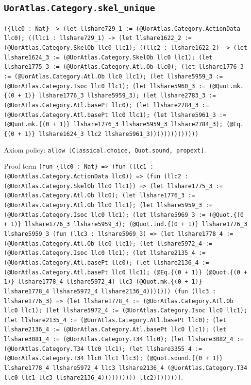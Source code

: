 \documentclass[11pt]{article}
\begin{document}
\subsection*{\texttt{UorAtlas.Category.skel\_unique}}
\noindent\texttt{(\{llc0 : Nat\} -> (let llshare729\_1 := (@UorAtlas.Category.ActionData llc0); ((llc1 : llshare729\_1) -> (let llshare1622\_2 := (@UorAtlas.Category.SkelOb llc0 llc1); ((llc2 : llshare1622\_2) -> (let llshare1624\_3 := (@UorAtlas.Category.SkelOb llc0 llc1); (let llshare1775\_3 := (@UorAtlas.Category.Atl.Ob llc0); (let llshare1776\_3 := (@UorAtlas.Category.Atl.Ob llc0 llc1); (let llshare5959\_3 := (@UorAtlas.Category.Isoc llc0 llc1); (let llshare5960\_3 := (@Quot.mk.\{(0 + 1)\} llshare1776\_3 llshare5959\_3); (let llshare2783\_3 := (@UorAtlas.Category.Atl.basePt llc0); (let llshare2784\_3 := (@UorAtlas.Category.Atl.basePt llc0 llc1); (let llshare5961\_3 := (@Quot.mk.\{(0 + 1)\} llshare1776\_3 llshare5959\_3 llshare2784\_3); (@Eq.\{(0 + 1)\} llshare1624\_3 llc2 llshare5961\_3))))))))))))))}\par
\noindent Axiom policy: \texttt{allow [Classical.choice, Quot.sound, propext]}.\par
\noindent Proof term \texttt{(fun \{llc0 : Nat\} => (fun (llc1 : (@UorAtlas.Category.ActionData llc0)) => (fun (llc2 : (@UorAtlas.Category.SkelOb llc0 llc1)) => (let llshare1775\_3 := (@UorAtlas.Category.Atl.Ob llc0); (let llshare1776\_3 := (@UorAtlas.Category.Atl.Ob llc0 llc1); (let llshare5959\_3 := (@UorAtlas.Category.Isoc llc0 llc1); (let llshare5969\_3 := (@Quot.\{(0 + 1)\} llshare1776\_3 llshare5959\_3); (@Quot.ind.\{(0 + 1)\} llshare1776\_3 llshare5959\_3 (fun (llc3 : llshare5969\_3) => (let llshare1778\_4 := (@UorAtlas.Category.Atl.Ob llc0 llc1); (let llshare5972\_4 := (@UorAtlas.Category.Isoc llc0 llc1); (let llshare2135\_4 := (@UorAtlas.Category.Atl.basePt llc0); (let llshare2136\_4 := (@UorAtlas.Category.Atl.basePt llc0 llc1); (@Eq.\{(0 + 1)\} (@Quot.\{(0 + 1)\} llshare1778\_4 llshare5972\_4) llc3 (@Quot.mk.\{(0 + 1)\} llshare1778\_4 llshare5972\_4 llshare2136\_4))))))) (fun (llc3 : llshare1776\_3) => (let llshare1778\_4 := (@UorAtlas.Category.Atl.Ob llc0 llc1); (let llshare5972\_4 := (@UorAtlas.Category.Isoc llc0 llc1); (let llshare2135\_4 := (@UorAtlas.Category.Atl.basePt llc0); (let llshare2136\_4 := (@UorAtlas.Category.Atl.basePt llc0 llc1); (let llshare3081\_4 := (@UorAtlas.Category.T34 llc0); (let llshare3082\_4 := (@UorAtlas.Category.T34 llc0 llc1); (let llshare3355\_4 := (@UorAtlas.Category.T34 llc0 llc1 llc3); (@Quot.sound.\{(0 + 1)\} llshare1778\_4 llshare5972\_4 llc3 llshare2136\_4 (@UorAtlas.Category.T34 llc0 llc1 llc3 llshare2136\_4)))))))))) llc2))))))))}.\par
\end{document}
